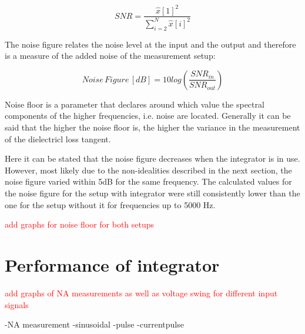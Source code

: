 \begin{equation}
SNR=\frac{\hat{x}[1]^2}{\sum\limits_{i=2}^{N}\hat{x}[i]^2}
\end{equation}

The noise figure relates the noise level at the input and the output and therefore is a measure of the added noise of the measurement setup:

\begin{equation}
 Noise\,Figure\, [dB]=10log\left(\frac{SNR_{in}}{SNR_{out}}\right)
\end{equation}

Noise floor is a parameter that declares around which value the spectral components of the higher frequencies, i.e. noise are located. Generally it can be said that the higher the noise floor is,
the higher the variance in the measurement of the dielectricl loss tangent.\cite{FaerberMVISS}

Here it can be stated that the noise figure decreases when the integrator is in use. However, most likely due to the non-idealities described in the next section, the noise figure varied within 5dB for the same frequency. 
The calculated values for the noise figure for the setup with integrator were still consistently lower than the one for the setup without it for frequencies up to 5000 Hz.


\textcolor{red}{add graphs for noise floor for both setups}

\section{Performance of integrator}
\textcolor{red}{add graphs of NA measurements as well as voltage swing for different input signals}

-NA measurement
-sinusoidal
-pulse
-currentpulse